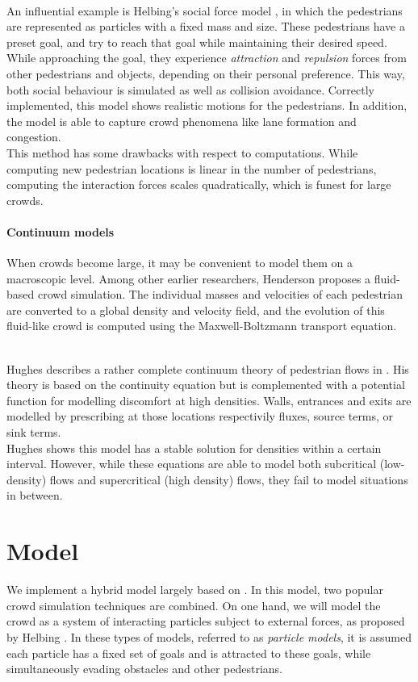 \documentclass{article}
\begin{document}
\ \\
An influential example is Helbing's social force model \cite{Helbing98}, in which the pedestrians are represented as particles with a fixed mass and size.
These pedestrians have a preset goal, and try to reach that goal while maintaining their desired speed. While approaching the goal, they experience \emph{attraction} and \emph{repulsion} forces from other pedestrians and objects, depending on their personal preference. This way, both social behaviour is simulated as well as collision avoidance. 
Correctly implemented, this model shows realistic motions for the pedestrians. In addition, the model is able to capture crowd phenomena like lane formation and congestion. 
\ \\
This method has some drawbacks with respect to computations. While computing new pedestrian locations is linear in the number of pedestrians, computing the interaction forces scales quadratically, which is funest for large crowds.
\ \\
\paragraph{Continuum models}
When crowds become large, it may be convenient to model them on a macroscopic level. Among other earlier researchers, Henderson \cite{Henderson74} proposes a fluid-based crowd simulation. The individual masses and velocities of each pedestrian are converted to a global density and velocity field, and the evolution of this fluid-like crowd is computed using the Maxwell-Boltzmann transport equation. 

\ \\
Hughes describes a rather complete continuum theory of pedestrian flows in \cite{Hughes99}. His theory is based on the continuity equation but is complemented with a potential function for modelling discomfort at high densities. Walls, entrances and exits are modelled by prescribing at those locations respectivily fluxes, source terms, or sink terms.
\ \\
Hughes shows this model has a stable solution for densities within a certain interval. However, while these equations are able to model both subcritical (low-density) flows and supercritical (high density) flows, they fail to model situations in between.

\newpage
\section{Model}
We implement a hybrid model largely based on \cite{Narain04}.
In this model, two popular crowd simulation techniques are combined. On one hand, we will model the crowd as a system of interacting particles subject to external forces, as proposed by Helbing \cite{blabla}. 
In these types of models, referred to as \emph{particle models}, it is assumed each particle has a fixed set of goals and is attracted to these goals, while simultaneously evading obstacles and other pedestrians.
\end{document}

